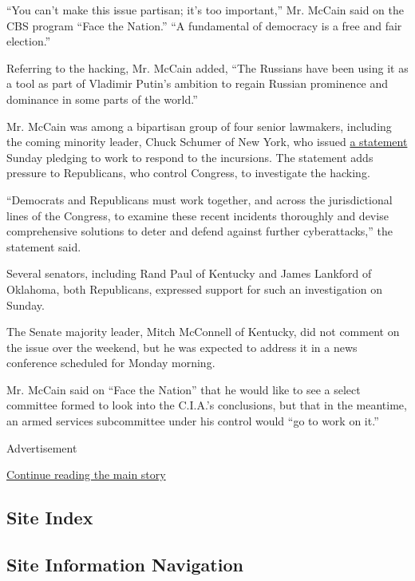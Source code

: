 ``You can't make this issue partisan; it's too important,'' Mr. McCain
said on the CBS program ``Face the Nation.'' ``A fundamental of
democracy is a free and fair election.''

Referring to the hacking, Mr. McCain added, ``The Russians have been
using it as a tool as part of Vladimir Putin's ambition to regain
Russian prominence and dominance in some parts of the world.''

Mr. McCain was among a bipartisan group of four senior lawmakers,
including the coming minority leader, Chuck Schumer of New York, who
issued
\href{http://www.armed-services.senate.gov/press-releases/mccain-graham-schumer-reed-joint-statement-on-reports-that-russia-interfered-with-the-2016-election}{a
statement} Sunday pledging to work to respond to the incursions. The
statement adds pressure to Republicans, who control Congress, to
investigate the hacking.

``Democrats and Republicans must work together, and across the
jurisdictional lines of the Congress, to examine these recent incidents
thoroughly and devise comprehensive solutions to deter and defend
against further cyberattacks,'' the statement said.

Several senators, including Rand Paul of Kentucky and James Lankford of
Oklahoma, both Republicans, expressed support for such an investigation
on Sunday.

The Senate majority leader, Mitch McConnell of Kentucky, did not comment
on the issue over the weekend, but he was expected to address it in a
news conference scheduled for Monday morning.

Mr. McCain said on ``Face the Nation'' that he would like to see a
select committee formed to look into the C.I.A.'s conclusions, but that
in the meantime, an armed services subcommittee under his control would
``go to work on it.''

Advertisement

\protect\hyperlink{after-bottom}{Continue reading the main story}

\hypertarget{site-index}{%
\subsection{Site Index}\label{site-index}}

\hypertarget{site-information-navigation}{%
\subsection{Site Information
Navigation}\label{site-information-navigation}}

